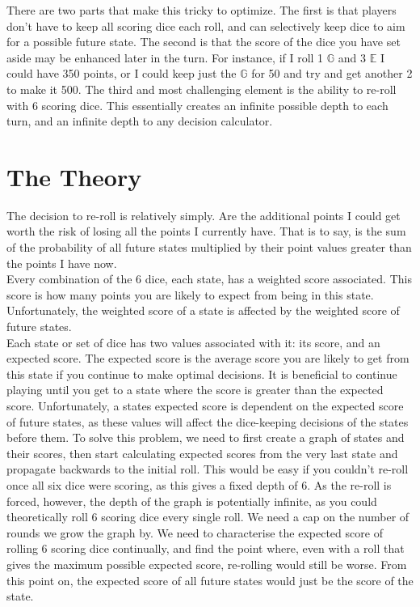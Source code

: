 \documentclass[a4paper]{article}
\newcommand{\gameg}{\ensuremath{\mathbb{G}}\xspace}
\newcommand{\gamee}{\ensuremath{\mathbb{E}}\xspace}
\begin{document}
There are two parts that make this tricky to optimize. The first is that players don't have to keep all scoring dice each roll, and can selectively keep dice to aim for a possible future state. The second is that the score of the dice you have set aside may be enhanced later in the turn. For instance, if I roll 1 \gameg and 3 \gamee I could have 350 points, or I could keep just the \gameg for 50 and try and get another 2 to make it 500. The third and most challenging element is the ability to re-roll with 6 scoring dice. This essentially creates an infinite possible depth to each turn, and an infinite depth to any decision calculator. \\

\section{The Theory}
The decision to re-roll is relatively simply. Are the additional points I could get worth the risk of losing all the points I currently have. That is to say, is the sum of the probability of all future states multiplied by their point values greater than the points I have now. \\

Every combination of the 6 dice, each state, has a weighted score associated. This score is how many points you are likely to expect from being in this state. Unfortunately, the weighted score of a state is affected by the weighted score of future states. \\

Each state or set of dice has two values associated with it: its score, and an expected score. The expected score is the average score you are likely to get from this state if you continue to make optimal decisions. It is beneficial to continue playing until you get to a state where the score is greater than the expected score. Unfortunately, a states expected score is dependent on the expected score of future states, as these values will affect the dice-keeping decisions of the states before them. To solve this problem, we need to first create a graph of states and their scores, then start calculating expected scores from the very last state and propagate backwards to the initial roll. This would be easy if you couldn't re-roll once all six dice were scoring, as this gives a fixed depth of 6. As the re-roll is forced, however, the depth of the graph is potentially infinite, as you could theoretically roll 6 scoring dice every single roll. We need a cap on the number of rounds we grow the graph by. We need to characterise the expected score of rolling 6 scoring dice continually, and find the point where, even with a roll that gives the maximum possible expected score, re-rolling would still be worse. From this point on, the expected score of all future states would just be the score of the state.
\end{document}
